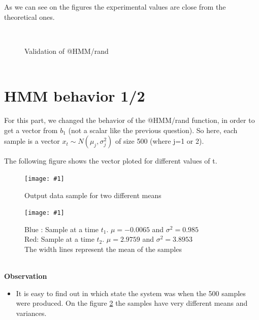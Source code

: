 \documentclass[a4paper]{report}
\newcommand{\img}[3]{\begin{figure}[!h] \centering \texttt{[image: \#1]}\captionsetup{justification=centering} \caption{#3} \label{#1} \end{figure}}
\newenvironment{pushright}[1]{\textbf{#1}
\begin{itemize}\item[\hspace{12pt}]}{\end{itemize}
}
\begin{document}
As we can see on the figures  the experimental values are close from the theoretical ones.
\begin{figure}[!h]
\centering
    \\
\captionsetup{justification=centering}
    \caption{Validation of @HMM/rand\\\color{blue}{Blue : Plot of the 20 attempts}\\\color{red}{Red : Mean over the 20 attempts}}
\end{figure}
\pagebreak
\section{HMM behavior 1/2}
For this part, we changed the behavior of the @HMM/rand function, in order to get a vector from $b_{1}$ (not a scalar like the previous question). So here, each sample is a vector $x_{t} \sim N(\mu_j,\sigma_j^2)$ of size 500 (where j=1 or 2).

The following figure shows the vector ploted for different values of t.
\img{hmm_different_mean}{0.7}{Output data sample for two different means}
\img{etude_hmmrand}{0.4}{{\color{blue}Blue : Sample at a time $t_1$. $\mu=-0.0065$ and $\sigma^2=0.985$}\\ {\color{red}Red: Sample at a time $t_2$. $\mu=2.9759$ and $\sigma^2=3.8953$}\\ The width lines represent the mean of the samples}\\
\begin{pushright}{Observation}
  It is easy to find out in which state the system was when the 500 samples were produced. On the figure \ref{etude_hmmrand} the samples have very different means and variances.
\end{pushright}
\end{document}

